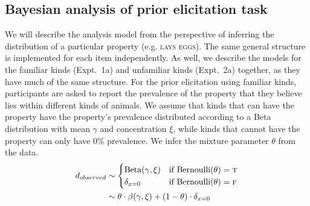 \documentclass{pnastwo}
\begin{document}
\begin{article}
\begin{materials}
\subsection{Bayesian analysis of prior elicitation task}
We will describe the analysis model from the perspective of inferring the distribution of a particular property (e.g. \textsc{lays eggs}). 
The same general structure is implemented for each item independently. 
As well, we describe the models for the familiar kinds (Expt.~1a) and unfamiliar kinds (Expt.~2a) together, as they have much of the same structure. 
For the prior elicitation using familiar kinds, participants are asked to report the prevalence of the property that they believe lies within different kinds of animals.
We assume that kinds that can have the property have the property's prevalence distributed according to a Beta distribution with mean $\gamma$ and concentration $\xi$, while kinds that cannot have the property can only have 0\% prevalence.
We infer the mixture parameter $\theta$ from the data.
\begin{align*}
d_{observed} & \sim \begin{cases}
				 \text{Beta}(\gamma, \xi) & \mbox{if } \text{Bernoulli}(\theta) = \textsc{t}  \\
				 \delta_{x=0} & \mbox{if }\text{Bernoulli}(\theta) = \textsc{f} \\
				\end{cases} \\
	 &  \sim \theta \cdot \beta(\gamma,\xi)+ (1 - \theta) \cdot \delta_{x=0}  \\
\end{align*}


\end{materials}
\end{article}
\end{document}
